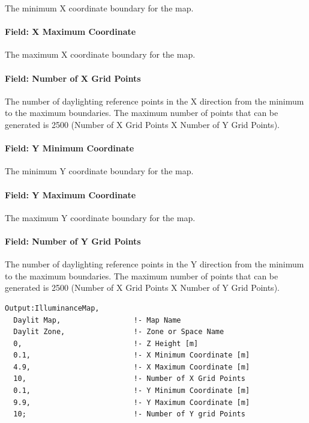 The minimum X coordinate boundary for the map.

\paragraph{Field: X Maximum Coordinate}\label{field-x-maximum-coordinate}

The maximum X coordinate boundary for the map.

\paragraph{Field: Number of X Grid Points}\label{field-number-of-x-grid-points}

The number of daylighting reference points in the X direction from the minimum to the maximum boundaries. The maximum number of points that can be generated is 2500 (Number of X Grid Points X Number of Y Grid Points).

\paragraph{Field: Y Minimum Coordinate}\label{field-y-minimum-coordinate}

The minimum Y coordinate boundary for the map.

\paragraph{Field: Y Maximum Coordinate}\label{field-y-maximum-coordinate}

The maximum Y coordinate boundary for the map.

\paragraph{Field: Number of Y Grid Points}\label{field-number-of-y-grid-points}

The number of daylighting reference points in the Y direction from the minimum to the maximum boundaries. The maximum number of points that can be generated is 2500 (Number of X Grid Points X Number of Y Grid Points).

\begin{lstlisting}
Output:IlluminanceMap,
  Daylit Map,                 !- Map Name
  Daylit Zone,                !- Zone or Space Name
  0,                          !- Z Height [m]
  0.1,                        !- X Minimum Coordinate [m]
  4.9,                        !- X Maximum Coordinate [m]
  10,                         !- Number of X Grid Points
  0.1,                        !- Y Minimum Coordinate [m]
  9.9,                        !- Y Maximum Coordinate [m]
  10;                         !- Number of Y grid Points
\end{lstlisting}

